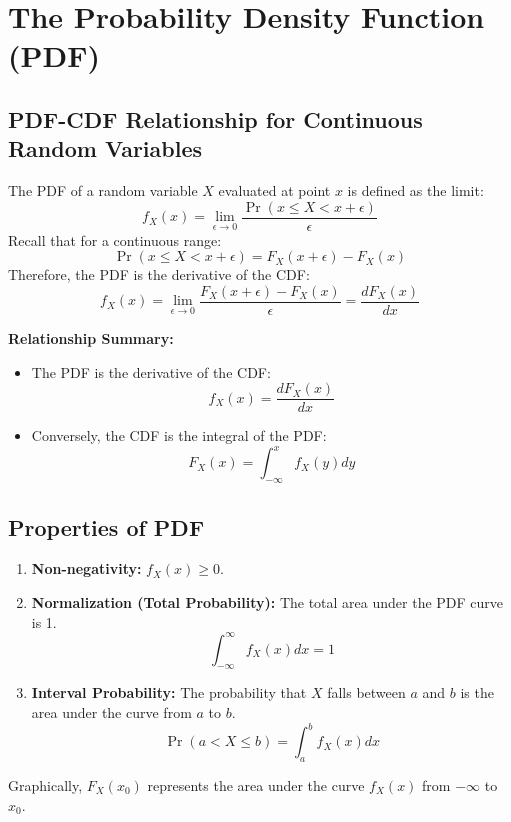 \documentclass[11pt]{article}
\begin{document}
\section{The Probability Density Function (PDF)}

\subsection{PDF-CDF Relationship for Continuous Random Variables}
The PDF of a random variable $X$ evaluated at point $x$ is defined as the limit:
$$ f_{X}(x) = \lim_{\epsilon \to 0} \frac{\Pr(x \le X < x + \epsilon)}{\epsilon} $$
Recall that for a continuous range:
$$ \Pr(x \le X < x + \epsilon) = F_{X}(x + \epsilon) - F_{X}(x) $$
Therefore, the PDF is the derivative of the CDF:
$$ f_{X}(x) = \lim_{\epsilon \to 0} \frac{F_{X}(x + \epsilon) - F_{X}(x)}{\epsilon} = \frac{dF_{X}(x)}{dx} $$

\textbf{Relationship Summary:}
\begin{itemize}
    \item The PDF is the derivative of the CDF:
    $$ f_{X}(x) = \frac{dF_{X}(x)}{dx} $$
    \item Conversely, the CDF is the integral of the PDF:
    $$ F_{X}(x) = \int_{-\infty}^{x} f_{X}(y) dy $$
\end{itemize}

\subsection{Properties of PDF}
\begin{enumerate}
    \item \textbf{Non-negativity:} $f_{X}(x) \ge 0$.
    \item \textbf{Normalization (Total Probability):} The total area under the PDF curve is 1.
    $$ \int_{-\infty}^{\infty} f_{X}(x) dx = 1 $$
    \item \textbf{Interval Probability:} The probability that $X$ falls between $a$ and $b$ is the area under the curve from $a$ to $b$.
    $$ \Pr(a < X \le b) = \int_{a}^{b} f_{X}(x) dx $$
\end{enumerate}
Graphically, $F_X(x_0)$ represents the area under the curve $f_X(x)$ from $-\infty$ to $x_0$.
\end{document}
